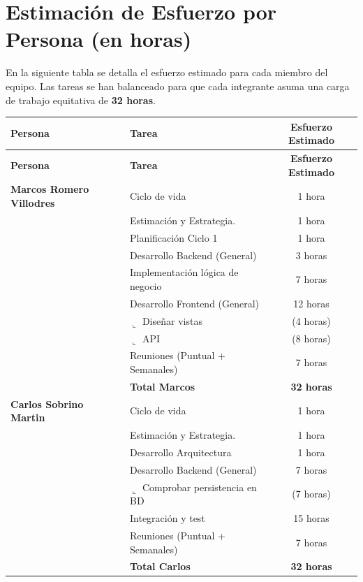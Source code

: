 \documentclass[12pt,a4paper,titlepage]{article}
\begin{document}
\vspace{0.5cm}

\section{Estimación de Esfuerzo por Persona (en horas)}

En la siguiente tabla se detalla el esfuerzo estimado para cada miembro del equipo. Las tareas se han balanceado para que cada integrante asuma una carga de trabajo equitativa de \textbf{32 horas}.

\vspace{0.5cm}

\begin{longtable}{@{}llc@{}}
    \toprule
    \textbf{Persona} & \textbf{Tarea} & \textbf{Esfuerzo Estimado} \\ \midrule
    \endfirsthead
    
    \toprule
    \textbf{Persona} & \textbf{Tarea} & \textbf{Esfuerzo Estimado} \\ \midrule
    \endhead
    
    \bottomrule
    \endfoot
    
    \bottomrule
    \endlastfoot

    \textbf{Marcos Romero Villodres} 
     & Ciclo de vida & 1 hora \\
     & Estimación y Estrategia. & 1 hora \\
     & Planificación Ciclo 1 & 1 hora \\
     & Desarrollo Backend (General) & 3 horas \\
     & Implementación lógica de negocio & 7 horas \\
     & Desarrollo Frontend (General) & 12 horas \\
     & $\llcorner$ Diseñar vistas & (4 horas) \\
     & $\llcorner$ API & (8 horas) \\
     & Reuniones (Puntual + Semanales) & 7 horas \\ 
     & \textbf{Total Marcos} & \textbf{32 horas} \\ \midrule

    \textbf{Carlos Sobrino Martin} 
     & Ciclo de vida & 1 hora \\
     & Estimación y Estrategia. & 1 hora \\
     & Desarrollo Arquitectura & 1 hora \\
     & Desarrollo Backend (General) & 7 horas \\
     & $\llcorner$ Comprobar persistencia en BD & (7 horas) \\
     & Integración y test & 15 horas \\
     & Reuniones (Puntual + Semanales) & 7 horas \\ 
     & \textbf{Total Carlos} & \textbf{32 horas} \\ \midrule


\end{longtable}
\end{document}
